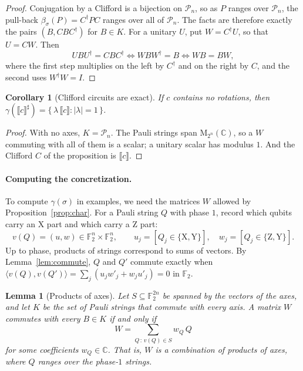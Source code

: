 \documentclass[11pt]{article}
\newtheorem{lemma}[theorem]{Lemma}
\newtheorem{corollary}[theorem]{Corollary}
\theoremstyle{definition}
\theoremstyle{remark}
\newcommand{\C}{\mathbb{C}}
\newcommand{\Pauli}{\mathcal{P}_n}
\newcommand{\Mat}{\mathrm{M}_{2^n}(\C)}
\newcommand{\sem}[1]{\llbracket #1 \rrbracket}
\newcommand{\abs}[1]{\llbracket #1 \rrbracket^{\sharp}}
\newcommand{\adj}{^{\dagger}}
\newcommand{\gam}{\gamma}
\newcommand{\back}{\beta}
\newcommand{\tX}{\mathrm{X}}
\newcommand{\tY}{\mathrm{Y}}
\newcommand{\tZ}{\mathrm{Z}}
\begin{document}
\begin{proof}
Conjugation by a Clifford is a bijection on $\Pauli$, so as $P$ ranges over $\Pauli$, the
pull-back $\back_\sigma(P) = C\adj P C$ ranges over all of $\Pauli$. The facts are therefore
exactly the pairs $(B, C B C\adj)$ for $B \in K$. For a unitary $U$, put $W = C\adj U$, so
that $U = CW$. Then
\[
  U B U\adj = C B C\adj
  \iff W B W\adj = B
  \iff W B = B W ,
\]
where the first step multiplies on the left by $C\adj$ and on the right by $C$, and the
second uses $W\adj W = I$.
\end{proof}

\begin{corollary}[Clifford circuits are exact]
If $c$ contains no rotations, then $\gam(\abs{c}) = \{\, \lambda\, \sem{c} : |\lambda| = 1 \,\}$.
\end{corollary}

\begin{proof}
With no axes, $K = \Pauli$. The Pauli strings span $\Mat$, so a $W$ commuting with all of
them is a scalar; a unitary scalar has modulus $1$. And the Clifford $C$ of the proposition
is $\sem{c}$.
\end{proof}

\paragraph{Computing the concretization.}
To compute $\gam(\sigma)$ in examples, we need the matrices $W$ allowed by
Proposition~\ref{prop:char}. For a Pauli string $Q$ with phase $1$, record which qubits
carry an $\tX$ part and which carry a $\tZ$ part:
\[
  v(Q) = (u, w) \in \mathbb{F}_2^n \times \mathbb{F}_2^n,\qquad
  u_j = [Q_j \in \{\tX,\tY\}],\quad w_j = [Q_j \in \{\tZ,\tY\}].
\]
Up to phase, products of strings correspond to sums of vectors. By
Lemma~\ref{lem:commute}, $Q$ and $Q'$ commute exactly when
$\langle v(Q), v(Q')\rangle = \sum_j (u_j w'_j + w_j u'_j) = 0$ in $\mathbb{F}_2$.

\begin{lemma}[Products of axes]\label{lem:products}
Let $S \subseteq \mathbb{F}_2^{2n}$ be spanned by the vectors of the axes, and let $K$ be
the set of Pauli strings that commute with every axis. A matrix $W$ commutes with every
$B \in K$ if and only if
\[
  W = \sum_{Q\,:\,v(Q) \in S} w_Q\, Q
\]
for some coefficients $w_Q \in \C$. That is, $W$ is a combination of products of axes,
where $Q$ ranges over the phase-$1$ strings.
\end{lemma}
\end{document}
